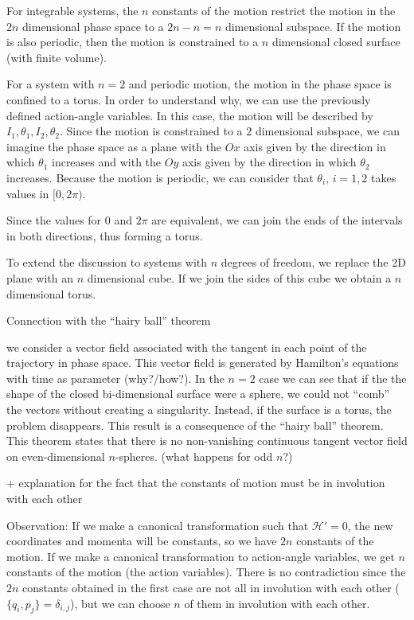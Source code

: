 \documentclass[../thesis.tex]{subfiles}
\theoremstyle{plain}
\begin{document}
For integrable systems, the \(n\) constants of the motion restrict the motion in the
\(2n\) dimensional phase space to a \(2n-n=n\) dimensional subspace. If the motion is
also periodic, then the motion is constrained to a \(n\) dimensional closed surface
(with finite volume).

For a system with \(n=2\) and periodic motion, the motion in the phase space is confined
to a torus. In order to understand why, we can use the previously defined action-angle variables.
In this case, the motion will be described by \(I_1, \theta_1, I_2, \theta_2\).
Since the motion is constrained to a \(2\) dimensional subspace, we can imagine the phase space
as a plane with the \(Ox\) axis given by the direction in which \(\theta_1\) increases and
with the \(Oy\) axis given by the direction in which \(\theta_2\) increases. Because the motion
is periodic, we can consider that \(\theta_i\), \(i=1,2\) takes values in \([0,2\pi)\).    %

Since the values for \(0\) and \(2\pi \) are equivalent, we can join the ends of the
intervals in both directions, thus forming a torus.

To extend the discussion to systems with \(n\) degrees of freedom,
we replace the 2D plane with an \(n\) dimensional cube. If we join the sides of
this cube we obtain a \(n\) dimensional torus.

{\color{red}Connection with the ``hairy ball'' theorem

we consider a vector field associated with the tangent in each point of the trajectory
in phase space. This vector field is generated by Hamilton's equations with time
as parameter{\color{red} (why?/how?)}.
In the \(n=2\) case we can see that if the the shape of the closed bi-dimensional
surface were a sphere, we could not ``comb'' the vectors without creating a singularity.
Instead, if the surface is a torus, the problem disappears. This result is a consequence of
the ``hairy ball'' theorem. This theorem states that there is no non-vanishing continuous
tangent vector field on even-dimensional $n$-spheres. (what happens for odd $n$?)
}

{\color{red}+ explanation for the fact that the constants of motion must be
in involution with each other

Observation:
If we make a canonical transformation such that \(\mathcal{H'} = 0\), the new
coordinates and momenta will be constants, so we have \(2n\) constants of the motion.
If we make a canonical transformation to action-angle variables, we get
\(n\) constants of the motion (the action variables).
There is no contradiction since the \(2n\) constants obtained in the first case
are not all in involution with each other (\( \{q_i,p_j\}=\delta_{i,j} \)), but
we can choose \(n\) of them in involution with each other.
}
\end{document}
